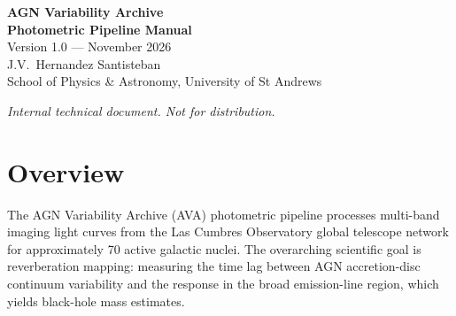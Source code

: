 \documentclass[12pt,a4paper]{article}
\begin{document}

\begin{titlepage}
\centering
\vspace*{3cm}
{\Huge\bfseries AGN Variability Archive}\\[0.5em]
{\Large\bfseries Photometric Pipeline Manual}\\[2em]
{\large Version 1.0 --- November 2026}\\[1em]
{\large J.V.\ Hernandez Santisteban}\\[0.5em]
{\normalsize School of Physics \& Astronomy, University of St Andrews}\\[3em]

\begin{abstract}
\noindent
This manual documents the photometric data-reduction pipeline of the AGN Variability Archive
(AVA), a multi-band monitoring programme conducted with the Las Cumbres Observatory (LCO)
global telescope network.  The pipeline has been in production since 2021 and processes light
curves for approximately 70 AGN supporting reverberation mapping campaigns.  Six stages are
described in detail: orchestration, initialisation, data download, source extraction with
SExtractor, photometric calibration against the APASS catalogue, and inter-calibration across
telescopes with the CALI algorithm.  Outputs include calibrated flux light curves in mJy,
diagnostic plots, and a merged light curve.  The manual also catalogues known limitations and
maps each stage to its replacement in AVA~v2.
\end{abstract}

\vfill
{\small\textit{Internal technical document.  Not for distribution.}}
\end{titlepage}

\tableofcontents
\clearpage

\section{Overview}
\label{sec:overview}

The AGN Variability Archive (AVA) photometric pipeline processes multi-band imaging light
curves from the Las Cumbres Observatory global telescope network for approximately 70 active
galactic nuclei.  The overarching scientific goal is reverberation mapping: measuring the
time lag between AGN accretion-disc continuum variability and the response in the broad
emission-line region, which yields black-hole mass estimates.
\end{document}
